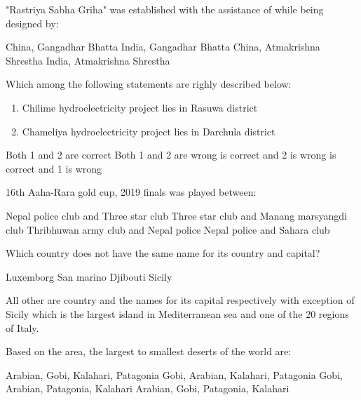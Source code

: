 \begin{questions}
\question "Rastriya Sabha Griha" was established with the assistance of \fillin[][3.5cm] while being designed by:
  \begin{choices}
  \CorrectChoice China, Gangadhar Bhatta
  \choice India, Gangadhar Bhatta
  \choice China, Atmakrishna Shrestha
  \choice India, Atmakrishna Shrestha
  \end{choices}

\question Which among the following statements are righly described below:
  \begin{enumerate}
  \item Chilime hydroelectricity project lies in Rasuwa district
  \item Chameliya hydroelectricity project lies in Darchula district
  \end{enumerate}
  \begin{choices}
  \CorrectChoice Both 1 and 2 are correct
  \choice Both 1 and 2 are wrong
   is correct and 2 is wrong
   is correct and 1 is wrong
  \end{choices}

\question 16th Aaha-Rara gold cup, 2019 finals was played between:
  \begin{choices}
  \CorrectChoice Nepal police club and Three star club
  \choice Three star club and Manang marsyangdi club
  \choice Thribhuwan army club and Nepal police
  \choice Nepal police and Sahara club
  \end{choices}

\question Which country does not have the same name for its country and capital?
  \begin{choices}
  \choice Luxemborg
  \choice San marino
  \choice Djibouti
  \CorrectChoice Sicily
  \end{choices}
  \begin{solution}
      All other are country and the names for its capital respectively with exception of Sicily which is the largest island in Mediterranean sea and one of the 20 regions of Italy.
  \end{solution}

\question Based on the area, the largest to smallest deserts of the world are:
  \begin{choices}
  \CorrectChoice Arabian, Gobi, Kalahari, Patagonia
  \choice Gobi, Arabian, Kalahari, Patagonia
  \choice Gobi, Arabian, Patagonia, Kalahari
  \choice Arabian, Gobi, Patagonia, Kalahari
  \end{choices}


\begin{solution}


\end{solution}
\end{questions}
